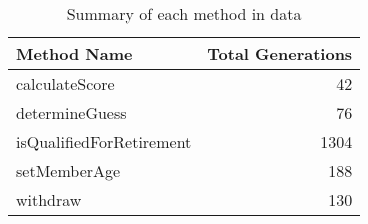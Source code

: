 \begin{table}[ht]
\centering
\begin{tabular}{lr}
  \hline
Method Name & Total Generations \\ 
  \hline
calculateScore &  42 \\ 
  determineGuess &  76 \\ 
  isQualifiedForRetirement & 1304 \\ 
  setMemberAge & 188 \\ 
  withdraw & 130 \\ 
   \hline
\end{tabular}
\caption{Summary of each method in data} 
\label{table:each_method_summary 7}
\end{table}
